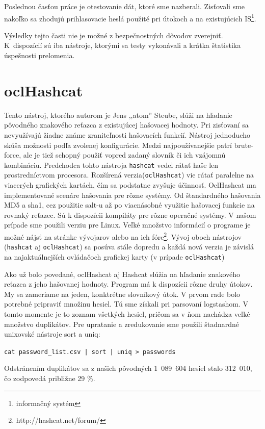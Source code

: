 \documentclass[12pt, oneside]{book}
\begin{document}
Poslednou časťou práce je otestovanie dát, ktoré sme nazberali. Zisťovali sme nakoľko sa zhodujú prihlasovacie heslá použité pri útokoch a na existujúcich IS\footnote{informačný systém}.

Výsledky tejto časti nie je možné z bezpečnostných dôvodov zverejniť. K~dispozícií sú iba nástroje, ktorými sa testy vykonávali a krátka štatistika ús\-peš\-nos\-ti prelomenia.

\section{oclHashcat}

Tento nástroj, ktorého autorom je Jens ,,atom'' Steube, slúži na hľadanie pôvodného znakového reťazca z existujúcej hašovacej hodnoty.
Pri zisťovaní sa nevyužívajú žiadne známe zraniteľnosti hašovacích funkcií.
Nástroj jednoducho skúša mož\-nos\-ti podľa zvolenej konfigurácie.
Medzi najpoužívanejšie patrí brute-force, ale je tiež schopný použiť vopred zadaný slovník či ich vzájomnú kombináciu.
Predchodca tohto nástroja \texttt{hashcat} vedel rátať haše len prostredníctvom procesora.
Rozšírená verzia(\texttt{oclHashcat}) vie rátať paralelne na viacerých grafických kartách, čím sa podstatne zvyšuje účinnosť.
OclHashcat ma implementované scenáre hašovania pre rôzne systémy.
Od štandardného hašovania MD5 a sha1, cez použitie salt-u až po viacnásobné využitie hašovacej funkcie na rovnaký reťazec.
Sú k dispozícii kompiláty pre rôzne operačné systémy.
V našom prípade sme použili verziu pre Linux.
Veľké množstvo informácií o programe je možné nájsť na stránke vývojarov\cite{oclhashcat} alebo na ich fóre\footnote{http://hashcat.net/forum/}.
Vývoj oboch nástrojov (\texttt{hashcat} aj \texttt{oclHashcat}) sa posúva stále dopredu a každá nová verzia je závislá na najaktuálnejších ovládačoch grafickej karty (v prípade \texttt{oclHashcat})

Ako už bolo povedané, oclHashcat aj Hashcat slúžia na hľadanie znakového reťazca z jeho hašovanej hodnoty.
Program má k dispozícii rôzne druhy útokov.
My sa zameriame na jeden, konktrétne slovníkový útok.
V prvom rade bolo potrebné pripraviť množinu hesiel.
Tú sme získali pri parsovaní logstashom.
V tomto momente je to zoznam všetkých hesiel, pričom sa v ňom nachádza veľké množstvo duplikátov.
Pre upratanie a zredukovanie sme použili štadnardné unixovské nástroje sort a uniq:

\texttt{cat password\_list.csv | sort | uniq > passwords}

Odstránením duplikátov sa z našich pôvodných 1~089~604 hesiel stalo 312~010, čo zodpovedá približne 29 \%.
\end{document}
